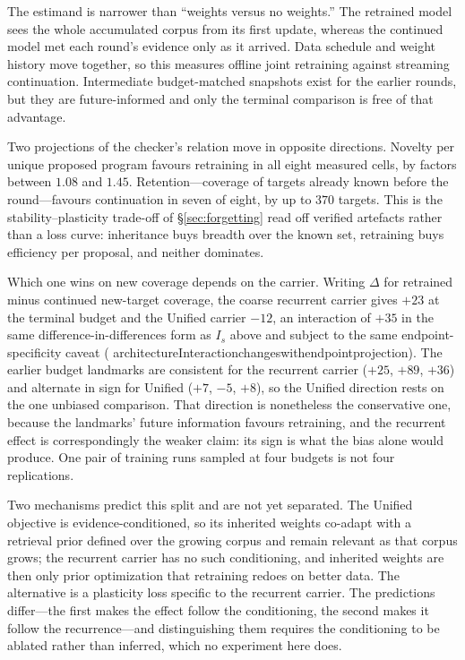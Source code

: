 \documentclass[11pt]{article}
\newcommand{\leanname}[1]{{\scriptsize\ttfamily
  \def\_{\textunderscore\allowbreak}#1}}
\begin{document}
The estimand is narrower than ``weights versus no weights.'' The retrained model sees the
whole accumulated corpus from its first update, whereas the continued model met each round's
evidence only as it arrived. Data schedule and weight history move together, so this measures
offline joint retraining against streaming continuation. Intermediate budget-matched snapshots
exist for the earlier rounds, but they are future-informed and only the terminal comparison is
free of that advantage.

Two projections of the checker's relation move in opposite directions. Novelty per unique
proposed program favours retraining in all eight measured cells, by factors between $1.08$ and
$1.45$. Retention---coverage of targets already known before the round---favours continuation
in seven of eight, by up to $370$ targets. This is the stability--plasticity trade-off of
\S\ref{sec:forgetting} read off verified artefacts rather than a loss curve: inheritance buys
breadth over the known set, retraining buys efficiency per proposal, and neither dominates.

Which one wins on new coverage depends on the carrier. Writing $\Delta$ for retrained minus
continued new-target coverage, the coarse recurrent carrier gives $+23$ at the terminal budget
and the Unified carrier $-12$, an interaction of $+35$ in the same difference-in-differences
form as $I_s$ above and subject to the same endpoint-specificity caveat
(\leanname{architectureInteraction\_changes\_with\_endpoint\_projection}). The earlier
budget landmarks are consistent for the recurrent carrier ($+25$, $+89$, $+36$) and
alternate in sign for Unified ($+7$, $-5$, $+8$), so the Unified direction rests on the one
unbiased comparison. That direction is nonetheless the conservative one, because the
landmarks' future information favours retraining, and the recurrent effect is correspondingly
the weaker claim: its sign is what the bias alone would produce. One pair of training runs
sampled at four budgets is not four replications.

Two mechanisms predict this split and are not yet separated. The Unified objective is
evidence-conditioned, so its inherited weights co-adapt with a retrieval prior defined over
the growing corpus and remain relevant as that corpus grows; the recurrent carrier has no such
conditioning, and inherited weights are then only prior optimization that retraining redoes on
better data. The alternative is a plasticity loss specific to the recurrent carrier. The
predictions differ---the first makes the effect follow the conditioning, the second makes it
follow the recurrence---and distinguishing them requires the conditioning to be ablated
rather than inferred, which no experiment here does.
\end{document}
